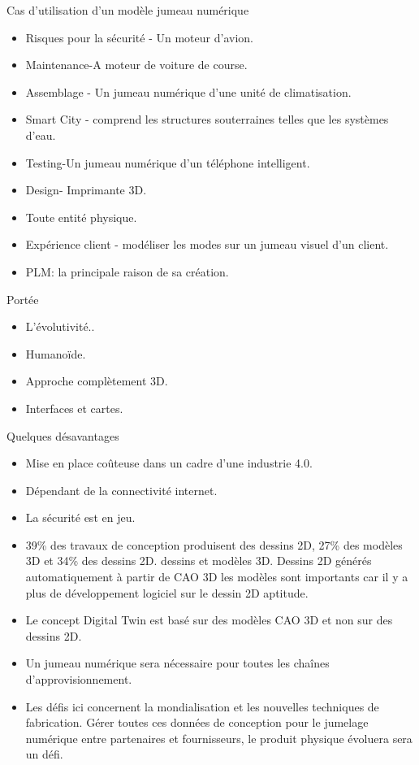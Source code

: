 \documentclass{beamer}
\begin{document}
 \begin{frame}{Cas d'utilisation d'un modèle jumeau numérique}
	 \begin{itemize}
       \item Risques pour la sécurité - Un moteur d'avion.
       \item Maintenance-A moteur de voiture de course.
       \item Assemblage - Un jumeau numérique d'une unité de climatisation.
       \item Smart City - comprend les structures souterraines telles que les systèmes d'eau.
       \item Testing-Un jumeau numérique d'un téléphone intelligent.
       \item Design- Imprimante 3D.
       \item Toute entité physique.
       \item Expérience client - modéliser les modes sur un jumeau visuel d'un client.
       \item PLM: la principale raison de sa création.
	 \end{itemize}
 \end{frame}
  \begin{frame}{Portée}
  \begin{itemize}
      \item L'évolutivité..
      \item Humanoïde.
      \item Approche complètement 3D.
	  \item Interfaces et cartes.
  \end{itemize}
 \end{frame}
 \begin{frame}{Quelques désavantages}
  \begin{itemize}
	  \item Mise en place coûteuse dans un cadre d'une industrie 4.0.
	  \item Dépendant de la connectivité internet.
	  \item La sécurité est en jeu.
      \item 39\% des travaux de conception produisent des dessins 2D, 27\% des modèles 3D et 34\% des dessins 
      2D. dessins et modèles 3D. Dessins 2D générés automatiquement à partir de CAO 3D les modèles sont 
      importants car il y a plus de développement logiciel sur le dessin 2D aptitude.
	 \item Le concept Digital Twin est basé sur des modèles CAO 3D et non sur des dessins 2D.
     \item Un jumeau numérique sera nécessaire pour toutes les chaînes d'approvisionnement.
     \item Les défis ici concernent la mondialisation et les nouvelles techniques de fabrication. Gérer toutes 
     ces données de conception pour le jumelage numérique entre partenaires et fournisseurs, le produit physique 
     évoluera sera un défi.
  \end{itemize}
 \end{frame}
\end{document}
